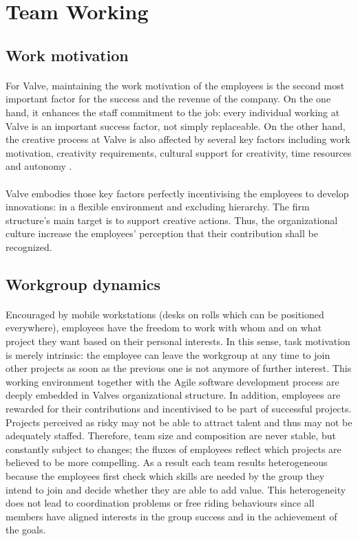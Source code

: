 \documentclass[12pt,twoside,notitle,a4paper]{article}
\begin{document}
\section{Team Working}
\subsection{Work motivation}
\paragraph{}For Valve, maintaining the work motivation of the employees is the second most important factor for the success and the revenue of the company. On the one hand, it enhances the staff commitment to the job: every individual working at Valve is an important success factor, not simply replaceable. On the other hand, the creative process at Valve is also affected by several key factors including  work motivation, creativity requirements, cultural support for creativity, time resources and autonomy \citep*{unsworth2010employees}.
\paragraph{}Valve embodies those key factors perfectly incentivising the employees to develop innovations: in a flexible environment and excluding hierarchy. The firm structure’s main target is to support creative actions. Thus, the organizational culture increase the employees’ perception that their contribution shall be recognized. 

 \subsection{Workgroup dynamics}
\paragraph{}Encouraged by mobile workstations (desks on rolls which can be positioned everywhere), employees have the freedom to work with whom and on what project they want based on their personal interests. In this sense, task motivation is merely intrinsic: the employee can leave the workgroup at any time to join other projects as soon as the previous one is not anymore of further interest. This working environment together with the Agile software development process are deeply embedded in Valves organizational structure. In addition, employees are rewarded for their contributions and incentivised to be part of successful projects. Projects perceived as risky may not be able to attract talent and thus may not be adequately staffed. Therefore, team size and composition are never stable, but constantly subject to changes; the fluxes of employees reflect which projects are believed to be more compelling. As a result each team results heterogeneous because the employees first check which skills are needed by the group they intend to join and decide whether they are able to add value. This heterogeneity does not lead to coordination problems or free riding behaviours since all members have aligned interests in the group success and in the achievement of the goals. 
\end{document}
